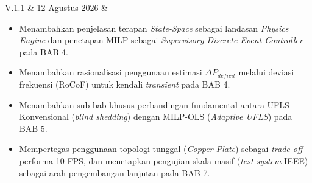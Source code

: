 {V.1.1}					&	%
{12 Agustus 2026}			&	%
{\noindent					%
    \begin{itemize}[leftmargin=*, nosep]
        \item Menambahkan penjelasan terapan \textit{State-Space} sebagai landasan \textit{Physics Engine} dan penetapan MILP sebagai \textit{Supervisory Discrete-Event Controller} pada BAB 4.
        \item Menambahkan rasionalisasi penggunaan estimasi $\Delta P_{deficit}$ melalui deviasi frekuensi (RoCoF) untuk kendali \textit{transient} pada BAB 4.
        \item Menambahkan sub-bab khusus perbandingan fundamental antara UFLS Konvensional (\textit{blind shedding}) dengan MILP-OLS (\textit{Adaptive UFLS}) pada BAB 5.
        \item Mempertegas penggunaan topologi tunggal (\textit{Copper-Plate}) sebagai \textit{trade-off} performa 10 FPS, dan menetapkan pengujian skala masif (\textit{test system} IEEE) sebagai arah pengembangan lanjutan pada BAB 7.
    \end{itemize}
}